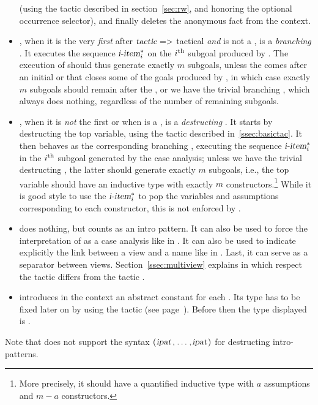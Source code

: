 \begin{itemize}
  (using the \ssr{}  tactic described in section~\ref{sec:rw},
  and honoring the optional occurrence selector),
  and finally deletes the anonymous fact from the context.
\item{},
   when it is the very \emph{first}  after ${\tac}\;\ssrC{=>}$
   tactical \emph{and} {\tac} is not a , is a \emph{branching}
   . It executes
   the sequence $\ssrN[i]{i-item}^*$ on the $i^{\rm th}$
   subgoal produced by {\tac}. The execution of {\tac}
   should thus generate exactly $m$
   subgoals, unless the \ssrC{[$\dots$]}  comes after an initial
   \ssrC{//} or \ssrC{//=}  that closes some of the goals produced by
   {\tac}, in which case exactly $m$ subgoals should remain after the
   , or we have the trivial branching  \ssrC{[]},
   which always does nothing, regardless of the number of remaining subgoals.
\item{}, when it is
   \emph{not} the first  or when {\tac} is a
   , is a \emph{destructing} .  It starts by
   destructing the top variable, using the \ssr{}  tactic
   described in~\ref{ssec:basictac}.  It then behaves as the
   corresponding branching , executing the sequence
   $\ssrN[i]{i-item}^*$ in the $i^{\rm th}$ subgoal generated by the case
   analysis; unless we have the trivial destructing 
   \ssrC{[]}, the latter should generate exactly $m$ subgoals, i.e., the
   top variable should have an inductive type with exactly $m$
   constructors.\footnote{More precisely, it should have a quantified
   inductive type with $a$ assumptions and $m - a$ constructors.}
   While it is good style to use the $\ssrN[i]{i-item}^*$
   to pop the variables and assumptions corresponding to each constructor,
   this is not enforced by \ssr{}.
\item\ssrC{-} does nothing, but counts as an intro pattern. It can also
  be used to force the interpretation of
   as a case analysis like in . It can also be used
   to indicate explicitly the link between a view and a name like in
   . Last, it can serve as a separator between
   views. Section~\ref{ssec:multiview} explains in which respect
   the tactic  differs from the tactic
   .
\item{} introduces in the context an abstract constant
   for each .  Its type has to be fixed later on by using
   the  tactic (see page~\pageref{ssec:abstract}).  Before then
   the type displayed is .\label{ssec:introabstract}
\end{itemize}
Note that \ssr{} does not support the syntax
$\ssrC{(}\ssrN{ipat}\ssrC{,}\dots\ssrC{,}\ssrN{ipat}\ssrC{)}$ for destructing
intro-patterns.

